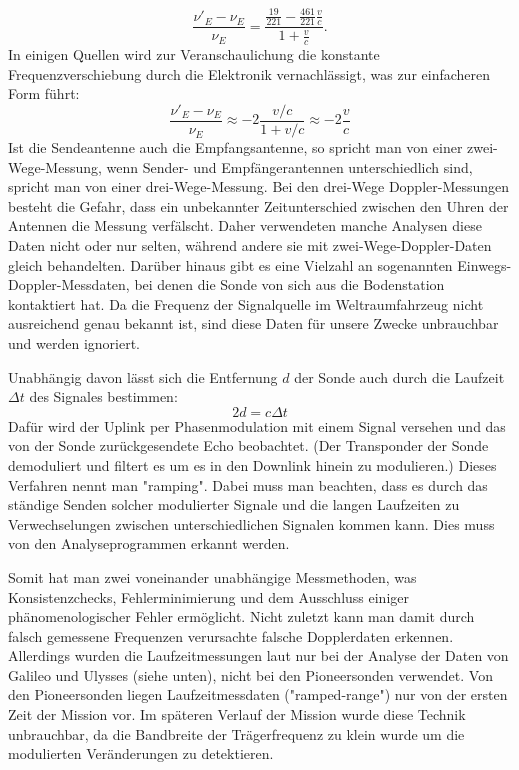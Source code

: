\begin{equation}\label{equ:rel}
 \frac{\nu'_E-\nu_E}{\nu_E} = \frac{\frac{19}{221}- \frac{461}{221}\frac{v}{c}}{1+\frac{v}{c}}.
\end{equation}
In einigen Quellen wird zur Veranschaulichung die konstante Frequenzverschiebung durch die Elektronik
vernachlässigt, was zur einfacheren Form führt:
\begin{equation}\label{equ:einf_rel}
 \frac{\nu'_E-\nu_E}{\nu_E} \approx -2\frac{v/c}{1+v/c} \approx -2 \frac{v}{c}
\end{equation}
Ist die Sendeantenne auch die Empfangsantenne, so spricht man von einer zwei-Wege-Messung, wenn Sender- und Empfängerantennen unterschiedlich sind, spricht man von einer drei-Wege-Messung\cite{Levy2009}. Bei den drei-Wege Doppler-Messungen besteht die Gefahr, dass ein unbekannter Zeitunterschied zwischen den Uhren der Antennen die Messung verfälscht. Daher verwendeten manche Analysen diese Daten nicht oder nur selten\cite{Anderson2002}, während andere sie mit zwei-Wege-Doppler-Daten gleich behandelten\cite{Markwardt2002}. Darüber hinaus gibt es eine Vielzahl an sogenannten Einwegs-Doppler-Messdaten, bei denen die Sonde von sich aus die Bodenstation kontaktiert hat. Da die Frequenz der Signalquelle im Weltraumfahrzeug nicht ausreichend genau bekannt ist, sind diese Daten für unsere Zwecke unbrauchbar und werden ignoriert. %

Unabhängig davon lässt sich die Entfernung $d$ der Sonde auch durch die Laufzeit $\Delta t$ des Signales bestimmen:
\begin{equation}
 2d = c \Delta t
\end{equation}
Dafür wird der Uplink per Phasenmodulation mit einem Signal versehen und das von der Sonde zurückgesendete Echo beobachtet. (Der Transponder der Sonde demoduliert und filtert es um es in den Downlink hinein zu modulieren.) Dieses Verfahren nennt man "ramping". %
Dabei muss man beachten, dass es durch das ständige Senden solcher modulierter Signale und die langen Laufzeiten zu Verwechselungen zwischen unterschiedlichen Signalen kommen kann. Dies muss von den Analyseprogrammen erkannt werden.

Somit hat man zwei voneinander unabhängige Messmethoden, was Konsistenzchecks,
Fehlerminimierung und dem Ausschluss einiger phänomenologischer Fehler ermöglicht. Nicht zuletzt kann man damit durch falsch gemessene Frequenzen verursachte falsche Dopplerdaten erkennen\cite{Anderson2002}.
Allerdings wurden die Laufzeitmessungen laut \cite{Anderson2002} nur bei der Analyse der Daten von Galileo und Ulysses (siehe unten), nicht bei den Pioneersonden verwendet. Von den Pioneersonden liegen Laufzeitmessdaten ("ramped-range") nur von der ersten Zeit der Mission vor. Im späteren Verlauf der Mission wurde diese Technik unbrauchbar, da die Bandbreite der Trägerfrequenz zu klein wurde um die modulierten Veränderungen zu detektieren\cite{Turyshev2010}. %

